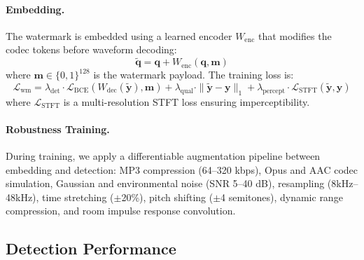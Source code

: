 \documentclass[11pt,a4paper]{article}
\begin{document}
\paragraph{Embedding.} The watermark is embedded using a learned encoder $W_{\text{enc}}$ that modifies the codec tokens before waveform decoding:
\begin{equation}
    \tilde{\bm{q}} = \bm{q} + W_{\text{enc}}(\bm{q}, \bm{m})
\end{equation}
where $\bm{m} \in \{0, 1\}^{128}$ is the watermark payload. The training loss is:
\begin{equation}
    \mathcal{L}_{\text{wm}} = \lambda_{\text{det}} \cdot \mathcal{L}_{\text{BCE}}(W_{\text{dec}}(\tilde{\bm{y}}), \bm{m}) + \lambda_{\text{qual}} \cdot \|\tilde{\bm{y}} - \bm{y}\|_1 + \lambda_{\text{percept}} \cdot \mathcal{L}_{\text{STFT}}(\tilde{\bm{y}}, \bm{y})
\end{equation}
where $\mathcal{L}_{\text{STFT}}$ is a multi-resolution STFT loss ensuring imperceptibility.

\paragraph{Robustness Training.} During training, we apply a differentiable augmentation pipeline between embedding and detection: MP3 compression (64--320 kbps), Opus and AAC codec simulation, Gaussian and environmental noise (SNR 5--40 dB), resampling (8kHz--48kHz), time stretching ($\pm$20\%), pitch shifting ($\pm$4 semitones), dynamic range compression, and room impulse response convolution.

\subsection{Detection Performance}
\end{document}
